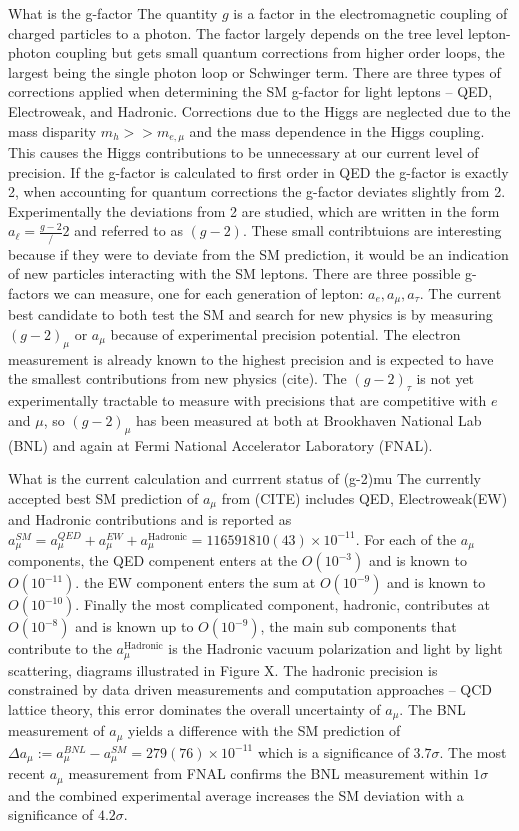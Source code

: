 What is the g-factor
The quantity $g$ is a factor in the electromagnetic coupling of charged particles to a photon. The factor largely depends on the tree level lepton-photon coupling but gets small quantum corrections from higher order loops, the largest being the single photon loop or Schwinger term. There are three types of corrections applied when determining the SM g-factor for light leptons -- QED, Electroweak, and Hadronic. Corrections due to the Higgs are neglected due to the mass disparity $m_h >> m_{e,\mu}$ and the mass dependence in the Higgs coupling. This causes the Higgs contributions to be unnecessary at our current level of precision. If the g-factor is calculated to first order in QED the g-factor is exactly 2, when accounting for quantum corrections the g-factor deviates slightly from 2. Experimentally the deviations from 2 are studied, which are written in the form $a_\ell = \frac{g-2}/2$ and referred to as $(g-2)$. These small contribtuions are interesting because if they were to deviate from the SM prediction, it would be an indication of new particles interacting with the SM leptons.  There are three possible g-factors we can measure, one for each generation of lepton: $a_e, a_\mu, a_\tau$. The current best candidate to both test the SM and search for new physics is by measuring $(g-2)_\mu$ or $a_\mu$ because of  experimental precision potential. The electron measurement is already known to the highest precision and is expected to have the smallest contributions from new physics (cite). The $(g-2)_\tau$ is not yet experimentally tractable to measure with precisions that are competitive with $e$ and $\mu$, so $(g-2)_\mu$ has been measured at both at Brookhaven National Lab (BNL) and again at Fermi National Accelerator Laboratory (FNAL).

What is the current calculation and currrent status of (g-2)mu
The currently accepted best SM prediction of $a_\mu$ from (CITE) includes QED, Electroweak(EW) and Hadronic contributions and is reported as $a_\mu^{SM} = a_\mu^{QED}+ a_\mu^{EW}+a_\mu^{\text{Hadronic}} = 116 591 810(43) \times 10^{-11}$. For each of the $a_\mu$ components, the QED compenent enters at the $O(10^{-3})$ and is known to $O(10^{-11})$. the EW component enters the sum at $O(10^{-9})$ and is known to $O(10^{-10})$. Finally the most complicated component, hadronic, contributes at $O(10^{-8})$ and is known up to $O(10^{-9})$, the  main sub components that contribute to the $a_\mu^{\text{Hadronic}}$ is the Hadronic vacuum polarization and light by light scattering, diagrams illustrated in Figure X. The hadronic precision is constrained by data driven measurements and computation approaches -- QCD lattice theory, this error dominates the overall uncertainty of $a_\mu$. The BNL measurement of $a_\mu$ yields a difference with the SM prediction of $\Delta a_\mu := a_\mu^{BNL} - a_\mu^{SM} = 279(76) \times 10^{-11}$ which is a significance of $3.7\sigma$. The most recent $a_\mu$ measurement from FNAL confirms the BNL measurement within $1\sigma$ and the combined experimental average increases the SM deviation with a significance of $4.2\sigma$.

